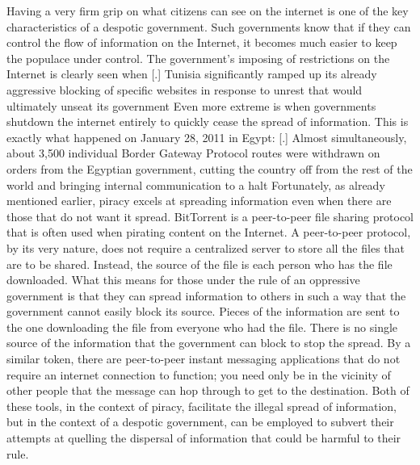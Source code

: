 \documentclass[onecolumn, 12pt]{article}
\begin{document}
\begin{refsection}
Having a very firm grip on what citizens can see on the internet is one of the key
characteristics of a despotic government. Such governments know that if they can control
the flow of information on the Internet, it becomes much easier to keep the populace under
control. The government's imposing of restrictions on the Internet is clearly seen when
[.]{%
  Tunisia significantly ramped up its already aggressive blocking of specific
  websites in response to unrest that would ultimately unseat its government%
} Even more extreme is when governments shutdown the internet entirely to
quickly cease the spread of information. This is exactly what happened on
January 28, 2011 in Egypt: [.]{%
  Almost simultaneously, about 3,500 individual Border Gateway Protocol routes
  \textelp{} were withdrawn on orders from the Egyptian government, cutting the
  country off from the rest of the world and bringing internal communication to
  a halt%
} Fortunately, as already mentioned earlier, piracy excels at spreading
information even when there are those that do not want it spread. BitTorrent is
a peer-to-peer file sharing protocol that is often used when pirating content on the
Internet. A peer-to-peer protocol, by its very nature, does not require a centralized
server to store all the files that are to be shared. Instead, the source of the file is
each person who has the file downloaded. What this means for those under the rule of an
oppressive government is that they can spread information to others in such a way that the
government cannot easily block its source. Pieces of the information are sent to the one
downloading the file from everyone who had the file. There is no single source of the
information that the government can block to stop the spread. By a similar token, there
are peer-to-peer instant messaging applications that do not require an internet connection
to function; you need only be in the vicinity of other people that the message can hop
through to get to the destination. Both of these tools, in the context of piracy, facilitate
the illegal spread of information, but in the context of a despotic government, can be
employed to subvert their attempts at quelling the dispersal of information that could be
harmful to their rule.


\end{refsection}
\end{document}
